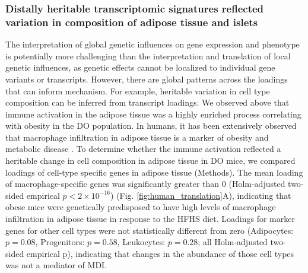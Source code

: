 \documentclass[
]{article}
\begin{document}
\subsubsection{Distally heritable transcriptomic signatures reflected
variation in composition of adipose tissue and
islets}\label{distally-heritable-transcriptomic-signatures-reflected-variation-in-composition-of-adipose-tissue-and-islets}

The interpretation of global genetic influences on gene expression and
phenotype is potentially more challenging than the interpretation and
translation of local genetic influences, as genetic effects cannot be
localized to individual gene variants or transcripts. However, there are
global patterns across the loadings that can inform mechanism. For
example, heritable variation in cell type composition can be inferred
from transcript loadings. We observed above that immune activation in
the adipose tissue was a highly enriched process correlating with
obesity in the DO population. In humans, it has been extensively
observed that macrophage infiltration in adipose tissue is a marker of
obesity and metabolic disease \cite{pmid24781408}. To determine whether
the immune activation reflected a heritable change in cell composition
in adipose tissue in DO mice, we compared loadings of cell-type specific
genes in adipose tissue (Methods). The mean loading of
macrophage-specific genes was significantly greater than 0
(Holm-adjusted two-sided empirical \(p < 2\times10^{-16}\)) (Fig.
\ref{fig:human_translation}A), indicating that obese mice were
genetically predisposed to have high levels of macrophage infiltration
in adipose tissue in response to the HFHS diet. Loadings for marker
genes for other cell types were not statistically different from zero
(Adipocytes: \(p = 0.08\), Progenitors: \(p = 0.58\), Leukocytes:
\(p = 0.28\); all Holm-adjusted two-sided empirical p), indicating that
changes in the abundance of those cell types was not a mediator of MDI.
\end{document}

